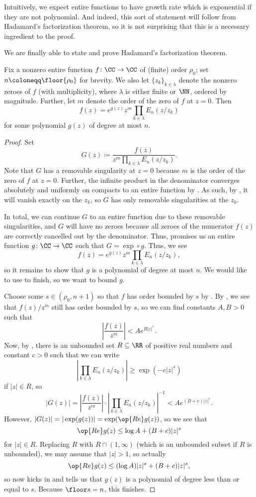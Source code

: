 \documentclass[notes.tex]{subfiles}
\begin{document}
\begin{remark}
	Intuitively, we expect entire functions to have growth rate which is exponential if they are not polynomial. And indeed, this sort of statement will follow from Hadamard's factorization theorem, so it is not surprising that this is a necessary ingredient to the proof.
\end{remark}
We are finally able to state and prove Hadamard's factorization theorem.
\begin{theorem} \label{thm:hadamard}
	Fix a nonzero entire function $f\colon\CC\to\CC$ of (finite) order $\rho_0$; set $n\coloneqq\floor{\rho_0}$ for brevity. We also let $\{z_k\}_{k\in\lambda}$ denote the nonzero zeroes of $f$ (with multiplicity), where $\lambda$ is either finite or $\NN$, ordered by magnitude. Further, let $m$ denote the order of the zero of $f$ at $z=0$. Then
	\[f(z)=e^{g(z)}z^m\prod_{k\in\lambda} E_n(z/z_k)\]
	for some polynomial $g(z)$ of degree at most $n$.
\end{theorem}
\begin{proof}
	Set
	\[G(z)\coloneqq\frac{f(z)}{z^m\prod_{k\in\lambda} E_n(z/z_k)}.\]
	Note that $G$ has a removable singularity at $z=0$ because $m$ is the order of the zero of $f$ at $z=0$. Further, the infinite product in the denominator converges absolutely and uniformly on compacts to an entire function by . As such, by , it will vanish exactly on the $z_k$, so $G$ has only removable singularities at the $z_k$.

	In total, we can continue $G$ to an entire function due to these removable singularities, and $G$ will have no zeroes because all zeroes of the numerator $f(z)$ are correctly cancelled out by the denominator. Thus,  promises us an entire function $g\colon\CC\to\CC$ such that $G={\exp}\circ g$. Thus, we see
	\[f(z)=e^{g(z)}z^m\prod_{k\in\lambda} E_n(z/z_k),\]
	so it remains to show that $g$ is a polynomial of degree at most $n$. We would like to use  to finish, so we want to bound $g$.

	Choose some $s\in(\rho_0,n+1)$ so that $f$ has order bounded by $s$ by . By , we see that $f(z)/z^m$ still has order bounded by $s$, so we can find constants $A,B>0$ such that
	\[\left|\frac{f(z)}{z^m}\right|<Ae^{B|z|^s}.\]
	Now, by , there is an unbounded set $R\subseteq\RR$ of positive real numbers and constant $c>0$ such that we can write
	\[\left|\prod_{k\in\lambda}E_n(z/z_k)\right|\ge\exp\left(-c|z|^s\right)\]
	if $|z|\in R$, so
	\[|G(z)|=\left|\frac{f(z)}{z^m}\right|\cdot\left|\prod_{k\in\lambda}E_n(z/z_k)\right|^{-1}<Ae^{(B+c)|z|^s}.\]
	However, $|G(z)|=|\exp(g(z))|=\exp(\op{Re}g(z))$, so we see that
	\[\op{Re}g(z)\le\log A+(B+c)|z|^s\]
	for $|z|\in R$. Replacing $R$ with $R\cap(1,\infty)$ (which is an unbounded subset if $R$ is unbounded), we may assume that $|z|>1$, so actually
	\[\op{Re}g(z)\le(\log A)|z|^s+(B+c)|z|^s,\]
	so  now kicks in and tells us that $g(z)$ is a polynomial of degree less than or equal to $s$. Because $\floor s=n$, this finishes.
\end{proof}
\end{document}
